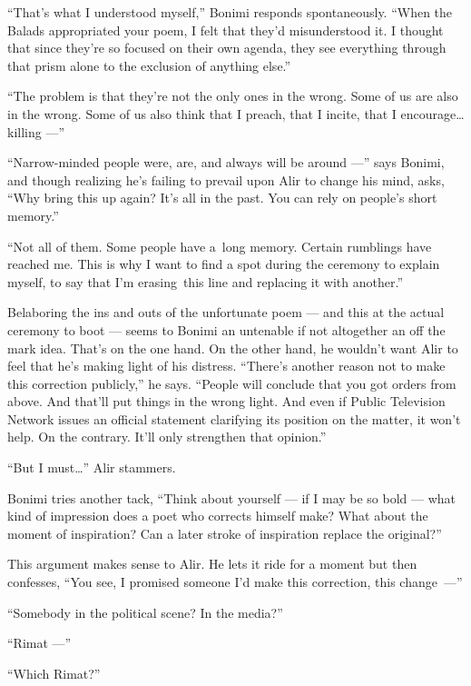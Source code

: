 \documentclass[twoside,11pt,openany]{book}
\begin{document}
``That's what I understood myself,'' Bonimi responds spontaneously.
``When the
Balads appropriated your poem, I felt that they'd misunderstood it. I thought that since they're so focused on their
own agenda, they see everything through that prism alone to the exclusion of anything else.''

``The problem is that they're not the only ones in the wrong. Some of us are also in the wrong. Some of us
also think that I preach, that I incite, that I encourage{\ldots}killing ---''

``Narrow-minded people were, are, and always will be around ---''
says Bonimi, and though
realizing he's failing to prevail upon Alir to change his mind, asks, ``Why bring this up again? It's all
in the past. You can rely on people's short memory.''

``Not all of them. Some people have a~long memory. Certain rumblings have reached me. This is why I want to
find a spot during the ceremony to explain myself, to say that I'm erasing~this line and replacing it with
another.''

Belaboring the ins and outs of the unfortunate poem ---  and this at the actual ceremony to boot --- seems to Bonimi an
untenable if not altogether an off the mark idea. That's on the one hand. On the other hand, he wouldn't want Alir to
feel that he's making light of his distress. ``There's another reason not to make this correction
publicly,'' he says. ``People will conclude that you got orders from above. And that'll put things in the wrong
light. And even if Public Television Network issues an official statement clarifying its position on the matter, it
won't help. On the contrary. It'll only strengthen that opinion.''

``But I must{\ldots}'' Alir stammers.

Bonimi tries another tack, ``Think about yourself --- if I may be so bold --- what kind of impression does a
poet who corrects himself make? What about the moment of inspiration? Can a later stroke of inspiration replace the
original?''

This argument makes sense to Alir. He lets it ride for a moment but then confesses, ``You see, I promised
someone I'd make this correction, this change~---''

``Somebody in the political scene? In the media?''

``Rimat ---''

``Which Rimat?''
\end{document}
